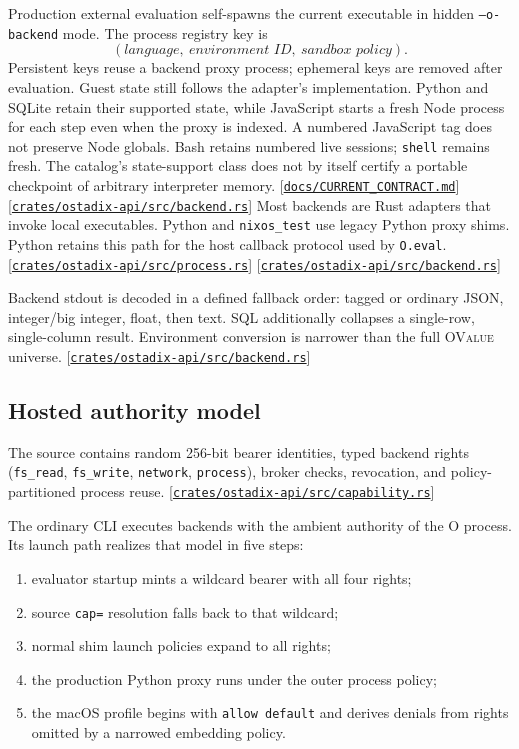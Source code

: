 \documentclass[11pt,oneside]{article}
\newcommand{\ovalue}{{\mdseries\textsc{OValue}}}
\newcommand{\src}[1]{\textcolor{OSlate}{\scriptsize[\href{https://github.com/lostadi/OSTADIX/blob/c0b02c326b2329a95ba52447c7180bc93957cd57/#1}{\nolinkurl{#1}}]}\allowbreak}
\begin{document}
Production external evaluation self-spawns the current executable in hidden
\texttt{--o-backend} mode. The process registry key is
\[
(\textit{language},\ \textit{environment ID},\ \textit{sandbox policy}).
\]
Persistent keys reuse a backend proxy process; ephemeral keys are removed
after evaluation. Guest state still follows the adapter's implementation.
Python and SQLite retain their supported state, while JavaScript starts a fresh
Node process for each step even when the proxy is indexed. A numbered
JavaScript tag does not preserve Node globals. Bash retains numbered live
sessions; \texttt{shell} remains fresh. The catalog's state-support class does
not by itself certify a portable checkpoint of arbitrary interpreter memory.
\src{docs/CURRENT_CONTRACT.md}
\src{crates/ostadix-api/src/backend.rs}
Most backends are Rust adapters that invoke local executables. Python and
\texttt{nixos\_test} use legacy Python proxy shims. Python retains this path
for the host callback protocol used by \texttt{O.eval}.
\src{crates/ostadix-api/src/process.rs}
\src{crates/ostadix-api/src/backend.rs}

Backend stdout is decoded in a defined fallback order: tagged or ordinary
JSON, integer/big integer, float, then text. SQL additionally collapses a
single-row, single-column result. Environment conversion is narrower than
the full \ovalue{} universe. \src{crates/ostadix-api/src/backend.rs}

\subsection{Hosted authority model}

The source contains random 256-bit bearer identities, typed backend rights
(\texttt{fs\_read}, \texttt{fs\_write}, \texttt{network},
\texttt{process}), broker checks, revocation, and policy-partitioned process
reuse. \src{crates/ostadix-api/src/capability.rs}

The ordinary CLI executes backends with the ambient authority of the O
process. Its launch path realizes that model in five steps:

\begin{enumerate}
  \item evaluator startup mints a wildcard bearer with all four rights;
  \item source \texttt{cap=} resolution falls back to that wildcard;
  \item normal shim launch policies expand to all rights;
  \item the production Python proxy runs under the outer process policy;
  \item the macOS profile begins with \texttt{allow default} and derives
        denials from rights omitted by a narrowed embedding policy.
\end{enumerate}
\end{document}
